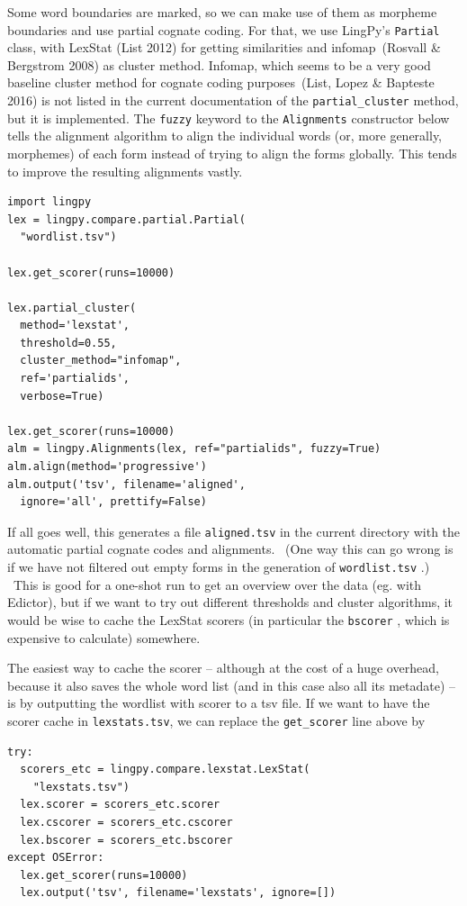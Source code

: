 \documentclass[
  a4paper,
  14pt,
  oneside,
  tablecaptionabove
]{scrbook}
\begin{document}
Some word boundaries are marked, so we can make use of them as morpheme
boundaries and use partial cognate coding. For that, we use LingPy's
\lstinline!Partial! class, with LexStat (List 2012) for getting
similarities and infomap~(Rosvall \& Bergstrom 2008) as cluster method.
Infomap, which seems to be a very good baseline cluster method for
cognate coding purposes~(List, Lopez \& Bapteste 2016) is not listed in
the current documentation of the \lstinline!partial_cluster! method, but
it is implemented. The \lstinline!fuzzy! keyword to the
\lstinline!Alignments! constructor below tells the alignment algorithm
to align the individual words (or, more generally, morphemes) of each
form instead of trying to align the forms globally. This tends to
improve the resulting alignments vastly.

\begin{lstlisting}[basicstyle=\small]
import lingpy
lex = lingpy.compare.partial.Partial(
  "wordlist.tsv")

lex.get_scorer(runs=10000)

lex.partial_cluster(
  method='lexstat',
  threshold=0.55,
  cluster_method="infomap",
  ref='partialids',
  verbose=True)

lex.get_scorer(runs=10000)
alm = lingpy.Alignments(lex, ref="partialids", fuzzy=True)
alm.align(method='progressive')
alm.output('tsv', filename='aligned',
  ignore='all', prettify=False)
\end{lstlisting}

If all goes well, this generates a file \lstinline!aligned.tsv! in the
current directory with the automatic partial cognate codes and
alignments.~ (One way this can go wrong is if we have not filtered out
empty forms in the generation of \lstinline!wordlist.tsv! .) ~This is
good for a one-shot run to get an overview over the data (eg. with
Edictor), but if we want to try out different thresholds and cluster
algorithms, it would be wise to cache the LexStat scorers (in particular
the \lstinline!bscorer! , which is expensive to calculate) somewhere.

The easiest way to cache the scorer -- although at the cost of a huge
overhead, because it also saves the whole word list (and in this case
also all its metadate) -- is by outputting the wordlist with scorer to a
tsv file. If we want to have the scorer cache in
\lstinline!lexstats.tsv!, we can replace the \lstinline!get_scorer! line
above by

\begin{lstlisting}[basicstyle=\small]
try:
  scorers_etc = lingpy.compare.lexstat.LexStat(
    "lexstats.tsv")
  lex.scorer = scorers_etc.scorer
  lex.cscorer = scorers_etc.cscorer
  lex.bscorer = scorers_etc.bscorer
except OSError:
  lex.get_scorer(runs=10000)
  lex.output('tsv', filename='lexstats', ignore=[])
\end{lstlisting}
\end{document}
